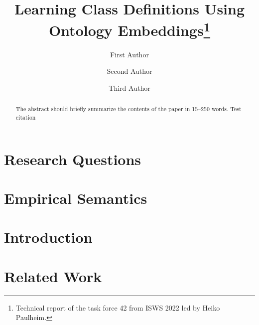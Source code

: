 \documentclass[runningheads]{llncs}
\begin{document}
%
\title{Learning Class Definitions Using Ontology Embeddings\thanks{Technical report of the task force 42 from ISWS 2022 led by Heiko Paulheim.}}

%
%
\author{First Author \and
Second Author \and
Third Author}
%
%
%
\maketitle              %
%
\begin{abstract}
The abstract should briefly summarize the contents of the paper in
15--250 words.  Test citation \cite{Berners-Lee2001}

\end{abstract}

\section{Research Questions}
\label{sec:rq}



\section{Empirical Semantics}
\label{sec:def}


\section{Introduction}
\label{sec:intro}


\section{Related Work}
\label{sec:related}

\end{document}
